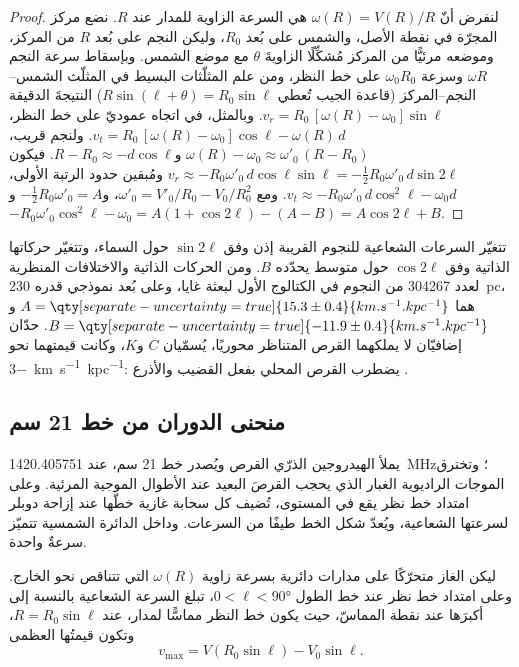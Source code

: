 \begin{proof}
لنفرض أنّ $\omega(R) = V(R)/R$ هي السرعة الزاوية للمدار عند $R$. نضع
مركز المجرّة في نقطة الأصل، والشمس على بُعد $R_0$، وليكن
النجم على بُعد $R$ من المركز، وموضعه مرئيًّا من
المركز مُشكِّلًا الزاويةَ $\theta$ مع موضع الشمس. وبإسقاط سرعة النجم
$\omega R$ وسرعة  $\omega_0 R_0$ على خط
النظر، ومن علم المثلّثات البسيط في المثلّث الشمس--النجم--المركز (قاعدة الجيب
تُعطي $R\sin(\ell + \theta) = R_0\sin\ell$) النتيجةَ الدقيقة
$v_r = R_0\,[\omega(R) - \omega_0]\sin\ell$. وبالمثل، في اتجاه
عموديّ على خط النظر،
$v_t = R_0\,[\omega(R) - \omega_0]\cos\ell - \omega(R)\,d$. ولنجم قريب،
$\omega(R) - \omega_0 \approx \omega'_0\,(R - R_0)$
و$R - R_0 \approx -d\cos\ell$. فيكون
$v_r \approx -R_0\omega'_0\,d\cos\ell\sin\ell = -\tfrac12 R_0\omega'_0\,
d\sin 2\ell$ ومُبقين حدود الرتبة الأولى،
$v_t \approx -R_0\omega'_0\,d\cos^2\ell - \omega_0 d$. ومع
$\omega'_0 = V'_0/R_0 - V_0/R_0^2$، و$-\tfrac12 R_0\omega'_0 = A$
و$-R_0\omega'_0\cos^2\ell - \omega_0 = A(1 + \cos 2\ell) - (A - B) =
A\cos 2\ell + B$.
\end{proof}

تتغيّر السرعات الشعاعية للنجوم القريبة إذن وفق $\sin 2\ell$ حول
السماء، وتتغيّر حركاتها الذاتية وفق $\cos 2\ell$ حول متوسط يحدّده $B$.
ومن الحركات الذاتية والاختلافات المنظرية لعدد \num{304267} من النجوم في الكتالوج الأول
لبعثة غايا، وعلى بُعد نموذجي قدره \qty{230}{pc}، 
هما $A = \qty[separate-uncertainty=true]{15.3 \pm 0.4}{km.s^{-1}.kpc^{-1}}$
و$B = \qty[separate-uncertainty=true]{-11.9 \pm 0.4}{km.s^{-1}.kpc^{-1}}$.
حدّان إضافيّان لا يملكهما القرص المتناظر محوريًا، يُسمّيان $C$
و$K$، وكانت قيمتهما نحو \qty{-3}{km.s^{-1}.kpc^{-1}}: 
يضطرب القرص المحلي بفعل القضيب والأذرع .

\subsection*{منحنى الدوران من خط 21 سم}

يملأ الهيدروجين الذرّي القرص ويُصدر خط 21 سم، عند
\qty{1420.405751}{MHz}؛ وتخترق الموجات الراديوية الغبار الذي يحجب
القرصَ البعيد عند الأطوال الموجية المرئية. وعلى امتداد خط نظر
يقع في المستوى، تُضيف كل سحابة غازية خطّها عند إزاحة دوبلر
لسرعتها الشعاعية، ويُعدّ شكل الخط طيفًا من
السرعات. وداخل الدائرة الشمسية تتميّز سرعةٌ واحدة.

\begin{theorem}\label{thm:b3:milky-way-galaxies:tangent}
ليكن الغاز متحرّكًا على مدارات دائرية بسرعة زاوية $\omega(R)$ التي
تتناقص نحو الخارج. وعلى امتداد خط نظر عند خط الطول
$0 < \ell < \ang{90}$، تبلغ السرعة الشعاعية بالنسبة إلى  أكبرَها
عند نقطة المماسّ، حيث يكون خط النظر مماسًّا لمدار، عند
$R = R_0\sin\ell$، وتكون قيمتُها العظمى
\[
v_\mathrm{max} = V(R_0\sin\ell) - V_0\sin\ell .
\]
\end{theorem}

